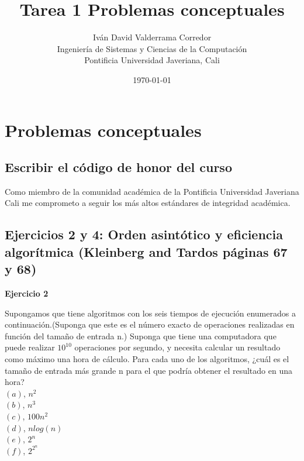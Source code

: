\documentclass[a4paper,12pt]{article}
\title{Tarea 1 Problemas conceptuales}
\author{%
  Iván David Valderrama Corredor\\ %
  Ingeniería de Sistemas y Ciencias de la Computación\\ %
  Pontificia Universidad Javeriana, Cali}
\date{\today}
\newcommand{\subfigureautorefname}{\figureautorefname}
\begin{document}
	
\renewcommand{\tablename}{\bfseries Tabla} %
\renewcommand{\figurename}{\bfseries Figura} %
%
\maketitle

\tableofcontents

\newpage


\section{Problemas conceptuales}

\subsection{Escribir el código de honor del curso}
Como miembro de la comunidad académica de la Pontificia Universidad Javeriana Cali me comprometo a seguir los más altos estándares de integridad académica.

\subsection{Ejercicios 2 y 4: Orden asintótico y eficiencia algorítmica (Kleinberg and Tardos páginas 67 y 68)}
\textbf{Ejercicio 2}

Supongamos que tiene algoritmos con los seis tiempos de ejecución enumerados a continuación.(Suponga que este es el número exacto de operaciones realizadas en función del tamaño de entrada n.) Suponga que tiene una computadora que puede realizar $10^{10}$ operaciones por segundo, y necesita calcular un resultado como máximo una hora de cálculo. Para cada uno de los algoritmos, ¿cuál es el tamaño de entrada más grande n para el que podría obtener el resultado en una hora?\\
 $(a)$, $n^2$\\
 $(b)$, $n^3$\\
 $(c)$, $100n^2$\\
 $(d)$, $nlog(n)$\\
 $(e)$, $2^n$\\
 $(f)$, $2^{2^n}$\\\\
\end{document}
